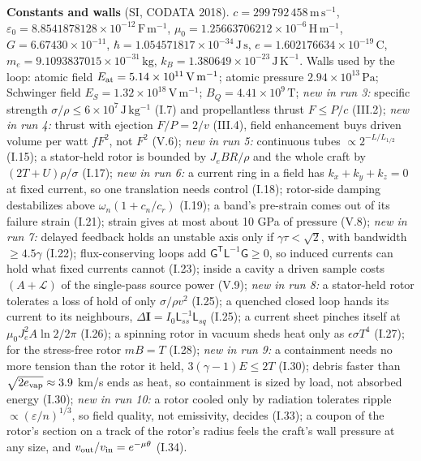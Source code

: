 \documentclass[10pt,a4paper]{article}
\newcommand{\e}[1]{\times10^{#1}}
\newcommand{\un}[1]{\,\mathrm{#1}}
\theoremstyle{plain}
\theoremstyle{definition}
\begin{document}
\medskip
\noindent\textbf{Constants and walls} (SI, CODATA 2018). $c=299\,792\,458\un{m\,s^{-1}}$, $\varepsilon_0=8.8541878128\e{-12}\un{F\,m^{-1}}$,
$\mu_0=1.25663706212\e{-6}\un{H\,m^{-1}}$, $G=6.67430\e{-11}$, $\hbar=1.054571817\e{-34}\un{J\,s}$, $e=1.602176634\e{-19}\un{C}$,
$m_e=9.1093837015\e{-31}\un{kg}$, $k_B=1.380649\e{-23}\un{J\,K^{-1}}$.
Walls used by the loop: atomic field $E_{\rm at}=5.14\e{11}\un{V\,m^{-1}}$; atomic pressure $2.94\e{13}\un{Pa}$; Schwinger field
$E_S=1.32\e{18}\un{V\,m^{-1}}$; $B_Q=4.41\e{9}\un{T}$; \emph{new in run 3:} specific strength $\sigma/\rho\le 6\e{7}\un{J\,kg^{-1}}$
(I.7) and propellantless thrust $F\le P/c$ (III.2); \emph{new in run 4:} thrust with ejection $F/P=2/v$ (III.4), field enhancement buys
driven volume per watt $fF^2$, not $F^2$ (V.6); \emph{new in run 5:} continuous tubes $\propto2^{-L/L_{1/2}}$ (I.15); a
stator-held rotor is bounded by $J_eBR/\rho$ and the whole craft by $(2T+U)\rho/\sigma$ (I.17); \emph{new in run 6:} a current ring in a
field has $k_x+k_y+k_z=0$ at fixed current, so one translation needs control (I.18); rotor-side damping destabilizes above
$\omega_n(1+c_n/c_r)$ (I.19); a band's pre-strain comes out of its failure strain (I.21); strain gives at most about 10 GPa of pressure (V.8);
\emph{new in run 7:} delayed feedback holds an unstable axis only if $\gamma\tau<\sqrt2$, with bandwidth $\ge4.5\gamma$ (I.22);
flux-conserving loops add $\mathsf G^{\mathsf T}\mathsf L^{-1}\mathsf G\ge0$, so induced currents can hold what fixed currents cannot (I.23); inside a
cavity a driven sample costs $(A+\mathcal L)$ of the single-pass source power (V.9); \emph{new in run 8:} a stator-held rotor tolerates a loss of hold of only $\sigma/\rho v^2$ (I.25); a quenched closed loop hands its current to its neighbours, $\Delta\mathbf I=I_0\mathsf L_{ss}^{-1}\mathsf L_{sq}$ (I.25); a current sheet pinches itself at $\mu_0J_e^2A\ln2/2\pi$ (I.26); a spinning rotor in vacuum sheds heat only as $\epsilon\sigma T^4$ (I.27); for the stress-free rotor $mB=T$ (I.28); \emph{new in run 9:} a containment needs no more tension than the rotor it held, $3(\gamma-1)E\le2T$ (I.30); debris faster than $\sqrt{2e_{\rm vap}}\approx3.9$ km/s ends as heat, so containment is sized by load, not absorbed energy (I.30); \emph{new in run 10:} a rotor cooled only by radiation tolerates ripple $\propto(\varepsilon/n)^{1/3}$, so field quality, not emissivity, decides (I.33); a coupon of the rotor's section on a track of the rotor's radius feels the craft's wall pressure at any size, and $v_{\rm out}/v_{\rm in}=e^{-\mu\theta}$ (I.34).
\end{document}
